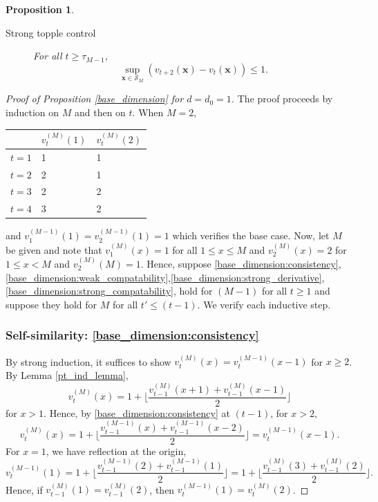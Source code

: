 \documentclass[12pt]{amsart}
\newtheorem{prop}{Proposition}[section]
\begin{document}
\begin{prop}
\begin{description}
		
			
			\item[Strong topple control] 
			For all $t \geq \tau_{M-1}$, 
			\begin{equation} \label{base_dimension:strong_topple}
			\sup_{\mathbf{x} \in \mathcal{S}_M} \left(v_{t+2}(\mathbf{x}) - v_{t}(\mathbf{x})\right) \leq 1.
			\end{equation}

			
		\end{description}
		
	\end{prop}
	
	\begin{proof}[Proof of Proposition \ref{base_dimension} for $d=d_0 = 1$]
		The proof proceeds by induction on $M$ and then on $t$. When $M=2$, 
		\begin{center}
			\begin{tabular}{l|l|l}
				& $v_t^{(M)}(1)$ & $v_t^{(M)}(2)$ \\ \hline
				$t=1$ & 1 & 1  \\ 
				$t=2$ & 2 & 1  \\ 
				$t=3$ & 2 & 2 \\
				$t=4$ & 3 & 2 
			\end{tabular}
		\end{center}
		and $v_1^{(M-1)}(1) = v_2^{(M-1)}(1) = 1$ which verifies the base case. Now, let $M$ be given and note that
		$v_1^{(M)}(x) = 1$ for all $1 \leq x \leq M$ and $v_2^{(M)}(x) = 2$ for $1 \leq x < M$
		and $v_2^{(M)}(M) = 1$. Hence, suppose \eqref{base_dimension:consistency},\eqref{base_dimension:weak_compatability},\eqref{base_dimension:strong_derivative},\eqref{base_dimension:strong_compatability}, hold for $(M-1)$ for all $t \geq 1$ 
		and suppose they hold for $M$ for all $t' \leq (t-1)$. 
		We verify each inductive step. 
		
		\subsubsection*{Self-similarity: \eqref{base_dimension:consistency}}
		By strong induction, it suffices to show $v_t^{(M)}(x) = v_t^{(M-1)}(x-1)$ for $x \geq 2$.
		By Lemma \ref{pt_ind_lemma}, 
		\[
		v_{t}^{(M)}(x) = 1 + \lfloor \frac{v_{t-1}^{(M)}(x+1) + v_{t-1}^{(M)}(x-1)}{2} \rfloor
		\]
		for $x > 1$. 
		Hence, by \eqref{base_dimension:consistency} at $(t-1)$, for $x > 2$, 
		\[
		v_{t}^{(M)}(x) = 1 + \lfloor \frac{v_{t-1}^{(M-1)}(x) + v_{t-1}^{(M-1)}(x-2)}{2} \rfloor = v_t^{(M-1)}(x-1).
		\]
		For $x=1$, we have reflection at the origin, 
		\[
		v_{t}^{(M-1)}(1) = 1 + \lfloor \frac{v_{t-1}^{(M-1)}(2) + v_{t-1}^{(M-1)}(1)}{2} \rfloor = 1 + \lfloor \frac{v_{t-1}^{(M)}(3) + v_{t-1}^{(M)}(2)}{2} \rfloor.
		\]
		Hence, if $v_{t-1}^{(M)}(1) = v_{t-1}^{(M)}(2)$, then $v_{t}^{(M-1)}(1) = v_{t}^{(M)}(2)$. 
		

\end{proof}
\end{document}
